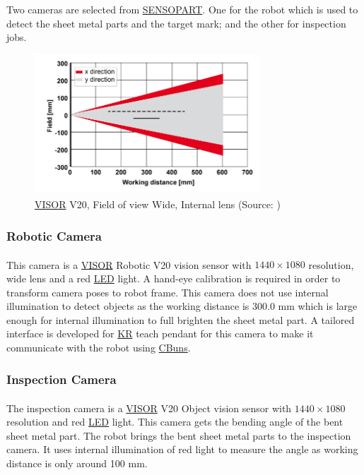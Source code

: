 Two cameras are selected from \hyperref[acro:SensoPart]{SENSOPART}. One for the robot which is used to detect the sheet metal parts and the target mark; and the other for inspection jobs.

\begin{figure}[h]
    \centering
    \includegraphics[width=0.75\textwidth]{figures/visor-v20-fov.png}
    \caption{\hyperref[acro:VISOR]{VISOR}\textsuperscript{\textregistered} V20, Field of view Wide, Internal lens (Source: \cite[page 357]{visor_user_manual})}
    \label{fig:visor-v20}
\end{figure}


\subsubsection{Robotic Camera}
\label{subsubsec:robotic-camera}
This camera is a \hyperref[acro:VISOR]{VISOR}\textsuperscript{\textregistered} Robotic V20 vision sensor with $1440 \times 1080$ resolution, wide lens and a red \hyperref[acro:LED]{LED} light.
\cite{visor-robotic}
A hand-eye calibration is required in order to transform camera poses to robot frame. This camera does not use internal illumination to detect
objects as the working distance is 300.0 mm which is large enough for internal illumination to full brighten the sheet metal part.
A tailored interface is developed for \hyperref[acro:KR]{KR} teach pendant for this camera to make it communicate with the robot using \hyperref[acro:CBun]{CBuns}.

\subsubsection{Inspection Camera}
\label{subsubsec:inspection-camera}
The inspection camera is a \hyperref[acro:VISOR]{VISOR}\textsuperscript{\textregistered} V20 Object vision sensor with $1440 \times 1080$ resolution and red \hyperref[acro:LED]{LED} light.
\cite{visor-object}
This camera gets the bending angle
of the bent sheet metal part. The robot brings the bent sheet metal parts to the inspection camera. 
It uses internal illumination of red light to measure the angle as working distance is only around 100 mm. 